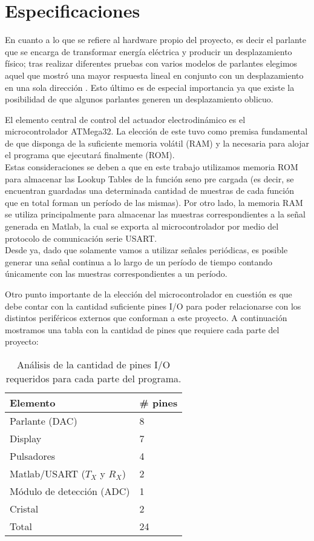 \section{Especificaciones}
\label{sec:especif}
En cuanto a lo que se refiere al hardware propio del proyecto, es decir el parlante que se encarga de transformar energía eléctrica y producir un desplazamiento físico; tras realizar diferentes pruebas con varios modelos de parlantes elegimos aquel que mostró una mayor respuesta lineal en conjunto con un desplazamiento en una sola dirección . Esto último es de especial importancia ya que existe la posibilidad de que algunos parlantes generen un desplazamiento oblicuo.

El elemento central de control del actuador electrodinámico es el microcontrolador ATMega32. La elección de este tuvo como premisa fundamental de que disponga de la suficiente memoria volátil (RAM) y la necesaria para alojar el programa que ejecutará finalmente (ROM).\\
Estas consideraciones se deben a que en este trabajo utilizamos memoria ROM para almacenar las Lookup Tables de la función seno pre cargada (es decir, se encuentran guardadas una determinada cantidad de muestras de cada función que en total forman un período de las mismas). Por otro lado, la memoria RAM se utiliza principalmente para almacenar las muestras correspondientes a la señal generada en Matlab, la cual se exporta al microcontrolador por medio del protocolo de comunicación serie USART. \\
Desde ya, dado que solamente vamos a utilizar señales periódicas, es posible generar una señal continua a lo largo de un período de tiempo contando únicamente con las muestras correspondientes a un período.

Otro punto importante de la elección del microcontrolador en cuestión es que debe contar con la cantidad suficiente pines I/O para poder relacionarse con los distintos periféricos externos que conforman a este proyecto. A continuación mostramos una tabla con la cantidad de pines que requiere cada parte del proyecto:

\begin{table}[H]
  \centering
  \begin{tabular}{ll}
    \toprule
    Elemento & \# pines \\
    \midrule
    Parlante (DAC) & 8 \\
    Display & 7 \\
    Pulsadores & 4 \\
	Matlab/USART ($T_X$ y $R_X$)  & 2 \\
	Módulo de detección (ADC) & 1 \\
    Cristal & 2 \\
    \midrule
    Total & 24 \\
    \bottomrule
  \end{tabular}
  \caption{Análisis de la cantidad de pines I/O requeridos para cada parte del programa.}
  \label{table:pines}
\end{table}

